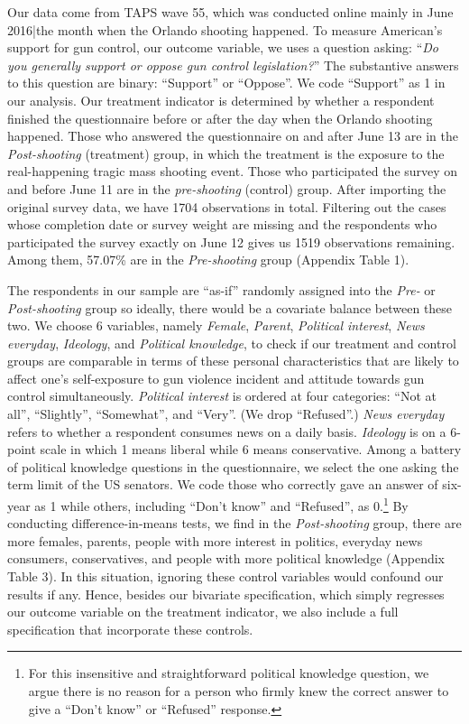 \documentclass[11pt]{article}
\begin{document}
Our data come from TAPS wave 55, which was conducted online mainly in June 2016|the month when the Orlando shooting happened. To measure American's support for gun control, our outcome variable, we uses a question asking: ``\emph{Do you generally support or oppose gun control legislation?}'' The substantive answers to this question are binary: ``Support'' or ``Oppose''. We code ``Support'' as 1 in our analysis. Our treatment indicator is determined by whether a respondent finished the questionnaire before or after the day when the Orlando shooting happened. Those who answered the questionnaire on and after June 13 are in the \emph{Post-shooting} (treatment) group, in which the treatment is the exposure to the real-happening tragic mass shooting event. Those who participated the survey on and before June 11 are in the \emph{pre-shooting} (control) group. After importing the original survey data, we have 1704 observations in total. Filtering out the cases whose completion date or survey weight are missing and the respondents who participated the survey exactly on June 12 gives us 1519 observations remaining. Among them, 57.07\% are in the \emph{Pre-shooting} group (Appendix Table 1).

The respondents in our sample are ``as-if'' randomly assigned into the \emph{Pre-} or \emph{Post-shooting} group so ideally, there would be a covariate balance between these two. We choose 6 variables, namely \emph{Female}, \emph{Parent}, \emph{Political interest}, \emph{News everyday}, \emph{Ideology}, and \emph{Political knowledge}, to check if our treatment and control groups are comparable in terms of these personal characteristics that are likely to affect one's self-exposure to gun violence incident and attitude towards gun control simultaneously. \emph{Political interest} is ordered at four categories: ``Not at all'', ``Slightly'', ``Somewhat'', and ``Very''. (We drop ``Refused''.) \emph{News everyday} refers to whether a respondent consumes news on a daily basis. \emph{Ideology} is on a 6-point scale in which 1 means liberal while 6 means conservative. Among a battery of political knowledge questions in the questionnaire, we select the one asking the term limit of the US senators. We code those who correctly gave an answer of six-year as 1 while others, including ``Don't know'' and ``Refused'', as 0.\footnote{For this insensitive and straightforward political knowledge question, we argue there is no reason for a person who firmly knew the correct answer to give a ``Don't know'' or ``Refused'' response.} By conducting difference-in-means tests, we find in the \emph{Post-shooting} group, there are more females, parents, people with more interest in politics, everyday news consumers, conservatives, and people with more political knowledge (Appendix Table 3). In this situation, ignoring these control variables would confound our results if any. Hence, besides our bivariate specification, which simply regresses our outcome variable on the treatment indicator, we also include a full specification that incorporate these controls. 
\end{document}
